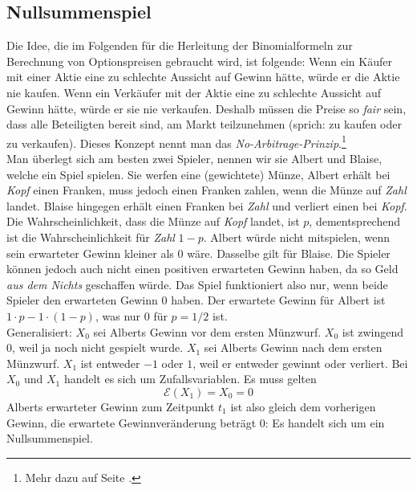 \documentclass[11pt]{report} %
\begin{document}
\subsection{Nullsummenspiel}
Die Idee, die im Folgenden für die Herleitung der Binomialformeln zur Berechnung von Optionspreisen gebraucht wird, ist folgende: Wenn ein Käufer mit einer Aktie eine zu schlechte Aussicht auf Gewinn hätte, würde er die Aktie nie kaufen. Wenn ein Verkäufer mit der Aktie eine zu schlechte Aussicht auf Gewinn hätte, würde er sie nie verkaufen. Deshalb müssen die Preise so \textit{fair} sein, dass alle Beteiligten bereit sind, am Markt teilzunehmen (sprich: zu kaufen oder zu verkaufen). Dieses Konzept nennt man das \textit{No-Arbitrage-Prinzip}.\footnote{Mehr dazu auf Seite \pageref{def:no-arbitrage-principle}.}
\\Man überlegt sich am besten zwei Spieler, nennen wir sie Albert und Blaise, welche ein Spiel spielen. Sie werfen eine (gewichtete) Münze, Albert erhält bei \textit{Kopf} einen Franken, muss jedoch einen Franken zahlen, wenn die Münze auf \textit{Zahl} landet. Blaise hingegen erhält einen Franken bei \textit{Zahl} und verliert einen bei \textit{Kopf}. Die Wahrscheinlichkeit, dass die Münze auf \textit{Kopf} landet, ist $p$, dementsprechend ist die Wahrscheinlichkeit für \textit{Zahl} $1-p$. Albert würde nicht mitspielen, wenn sein erwarteter Gewinn kleiner als 0 wäre. Dasselbe gilt für Blaise. Die Spieler können jedoch auch nicht einen positiven erwarteten Gewinn haben, da so Geld \textit{aus dem Nichts} geschaffen würde. Das Spiel funktioniert also nur, wenn beide Spieler den erwarteten Gewinn $0$ haben. Der erwartete Gewinn für Albert ist $1\cdot p -1\cdot (1-p)$, was nur $0$ für $p=1/2$ ist.
\\Generalisiert: $X_0$ sei Alberts Gewinn vor dem ersten Münzwurf. $X_0$ ist zwingend $0$, weil ja noch nicht gespielt wurde. $X_1$ sei Alberts Gewinn nach dem ersten Münzwurf. $X_1$ ist entweder $-1$ oder $1$, weil er entweder gewinnt oder verliert. Bei $X_0$ und $X_1$ handelt es sich um Zufallsvariablen. Es muss gelten $$\mathcal{E}(X_1) = X_0 = 0$$
Alberts erwarteter Gewinn zum Zeitpunkt $t_1$ ist also gleich dem vorherigen Gewinn, die erwartete Gewinnveränderung beträgt 0: Es handelt sich um ein Nullsummenspiel.
\end{document}
